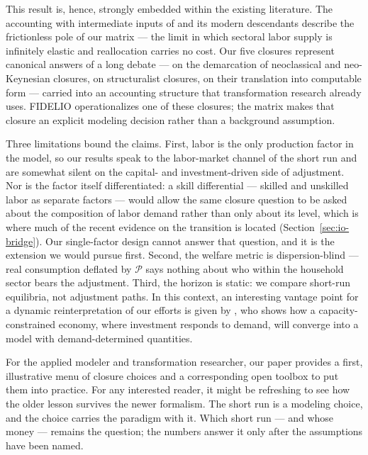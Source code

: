 This result is, hence, strongly embedded within the existing literature.
The accounting with intermediate inputs of \citet{Hulten.1978} and its
modern descendants \citep{Baqaee.2021,Acemoglu.2012} describe the
frictionless pole of our matrix --- the limit in which sectoral labor supply
is infinitely elastic and reallocation carries no cost. Our five closures represent  canonical answers of a long debate --- \citet{Sen1963} on the demarcation of neoclassical and neo-Keynesian closures, \citet{Taylor1990} on structuralist closures, \citet{Rose.1995} on their translation into computable form ---
carried into an accounting structure that transformation research already
uses. FIDELIO \citep{Rocchi.2025} operationalizes one of these closures; the
matrix makes that closure an explicit modeling decision rather than a
background assumption.

Three limitations bound the claims. First, labor is the only production factor in the model, so our results speak to the labor-market channel of the short run and are somewhat silent on the capital- and investment-driven side of adjustment. Nor is the factor itself differentiated: a skill differential --- skilled and unskilled
labor as separate factors --- would allow the same closure question to be asked about
the composition of labor demand rather than only about its level, which is where much of
the recent evidence on the transition is located (Section~\ref{sec:io-bridge}). Our
single-factor design cannot answer that question, and it is the extension we would
pursue first. Second, the welfare metric is dispersion-blind --- real consumption deflated by $\mathcal{P}$ says nothing about who within the household sector bears
the adjustment. Third, the horizon is static: we compare short-run equilibria, not adjustment paths. In this context, an interesting vantage point for a dynamic reinterpretation of our efforts is given by \citet{McGregor.1996}, who shows how a capacity-constrained economy, where investment responds to demand, will converge into a model with demand-determined quantities.


For the applied modeler and transformation researcher, our paper provides a first, illustrative menu of closure choices and a corresponding open toolbox to put them into practice. For any interested reader, it might be refreshing to see how the older lesson survives the newer formalism. The short run is a modeling choice, and the choice carries the paradigm with it. Which short run --- and whose money --- remains the question; the numbers answer it only after the assumptions have been named.
